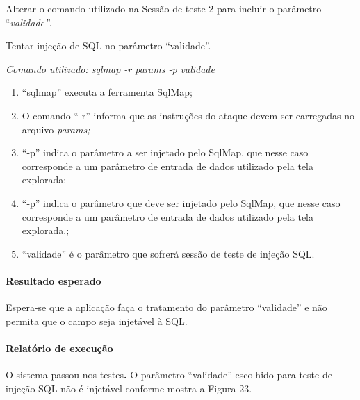 \documentclass[
    12pt,               %
    openright,          %
    oneside,            %
    a4paper,            %
    section=TITLE,     %
    english,            %
    french,             %
    spanish,            %
    brazil              %
    ]{abntex2}
\begin{document}
Alterar o comando utilizado na Sessão de teste 2 para incluir o parâmetro \textquotedblleft{}\emph{validade\textquotedblright{}}.


Tentar injeção de SQL no parâmetro \textquotedblleft{}validade\textquotedblright{}.


\emph{Comando utilizado: sqlmap -r params -p validade}



\begin{enumerate}[start=1]
	
\item \textquotedblleft{}sqlmap\textquotedblright{} executa a ferramenta SqlMap;
	
\item O comando \textquotedblleft{}-r\textquotedblright{} informa que as instruções do ataque devem ser carregadas no arquivo \emph{params;}
	
\item \textquotedblleft{}-p\textquotedblright{} indica o parâmetro a ser injetado pelo SqlMap, que nesse caso corresponde a um parâmetro de entrada de dados utilizado pela tela explorada;
	
\item \textquotedblleft{}-p\textquotedblright{} indica o parâmetro que deve ser injetado pelo SqlMap, que nesse caso corresponde a um parâmetro de entrada de dados utilizado pela tela explorada.;
	
\item \textquotedblleft{}validade\textquotedblright{} é o parâmetro que sofrerá sessão de teste de injeção SQL.

\end{enumerate}


\paragraph*{Resultado esperado}

Espera-se que a aplicação faça o tratamento do parâmetro \textquotedblleft{}validade\textquotedblright{} e não permita que o campo seja injetável à SQL.



\paragraph*{Relatório de execução}

O sistema passou nos testes\textbf{. }O parâmetro \textquotedblleft{}validade\textquotedblright{} escolhido para teste de injeção SQL não é injetável conforme mostra a Figura 23.
\end{document}
